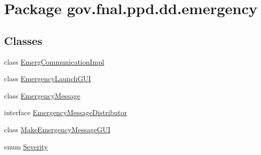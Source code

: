 \hypertarget{namespacegov_1_1fnal_1_1ppd_1_1dd_1_1emergency}{\section{Package gov.\-fnal.\-ppd.\-dd.\-emergency}
\label{namespacegov_1_1fnal_1_1ppd_1_1dd_1_1emergency}
}
\subsection*{Classes}
\begin{DoxyCompactItemize}
\item 
class \hyperlink{classgov_1_1fnal_1_1ppd_1_1dd_1_1emergency_1_1EmergCommunicationImpl}{Emerg\-Communication\-Impl}
\item 
class \hyperlink{classgov_1_1fnal_1_1ppd_1_1dd_1_1emergency_1_1EmergencyLaunchGUI}{Emergency\-Launch\-G\-U\-I}
\item 
class \hyperlink{classgov_1_1fnal_1_1ppd_1_1dd_1_1emergency_1_1EmergencyMessage}{Emergency\-Message}
\item 
interface \hyperlink{interfacegov_1_1fnal_1_1ppd_1_1dd_1_1emergency_1_1EmergencyMessageDistributor}{Emergency\-Message\-Distributor}
\item 
class \hyperlink{classgov_1_1fnal_1_1ppd_1_1dd_1_1emergency_1_1MakeEmergencyMessageGUI}{Make\-Emergency\-Message\-G\-U\-I}
\item 
enum \hyperlink{enumgov_1_1fnal_1_1ppd_1_1dd_1_1emergency_1_1Severity}{Severity}
\end{DoxyCompactItemize}
